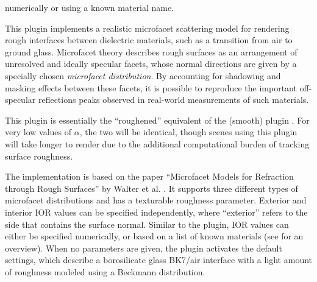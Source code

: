 {{        numerically or using a known material name. }
}\vspace{4mm}

This plugin implements a realistic microfacet scattering model for rendering
rough interfaces between dielectric materials, such as a transition from air to
ground glass. Microfacet theory describes rough surfaces as an arrangement of
unresolved and ideally specular facets, whose normal directions are given by
a specially chosen \emph{microfacet distribution}. By accounting for shadowing
and masking effects between these facets, it is possible to reproduce the important
off-specular reflections peaks observed in real-world measurements of such
materials.

This plugin is essentially the ``roughened'' equivalent of the (smooth) plugin
. For very low values of $\alpha$, the two will
be identical, though scenes using this plugin will take longer to render
due to the additional computational burden of tracking surface roughness.

The implementation is based on the paper ``Microfacet Models
for Refraction through Rough Surfaces'' by Walter et al.
\cite{Walter07Microfacet}. It supports three different types of microfacet
distributions and has a texturable roughness parameter. Exterior and
interior IOR values can be specified independently, where ``exterior''
refers to the side that contains the surface normal. Similar to the
 plugin, IOR values can either be specified
numerically, or based on a list of known materials (see
 for an overview). When no parameters are given,
the plugin activates the default settings, which describe a borosilicate
glass BK7/air interface with a light amount of roughness modeled using a
Beckmann distribution.

